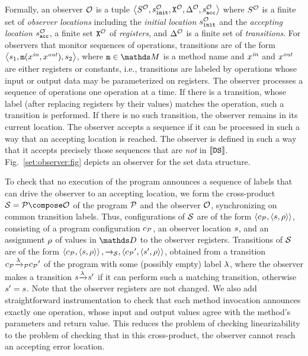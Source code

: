 Formally, an observer ${\mathcal O}$ is a tuple
$\left\langle S^{\mathcal O},s^{\mathcal O}_{\tt init},{\tt X}^{{\mathcal O}},\Delta^{\mathcal O},s^{\mathcal O}_{\tt acc}\right\rangle$ where $S^{\mathcal O}$ is a finite set 
of {\it observer locations} including the 
{\it initial location} $s^{\mathcal O}_{\tt init}$ and
the {\it accepting location} $s^{\mathcal O}_{\tt acc}$, 
a finite set ${\tt X}^{{\mathcal O}}$  
of {\it registers}, and $\Delta^{\mathcal O}$ is a finite
set of {\it transitions}.
%
%
For observers that monitor sequences of operations,
transitions are of the form 
$\left\langle s_1,{\tt m}(x^{\it in},x^{\it out}),s_2\right\rangle$,
where $\mname\in\malphabet$ is a method name and 
$x^{\it in}$ and $x^{\it out}$ are either registers or constants, i.e.,
transitions are labeled by 
operations whose input or output data may be parameterized on registers.
The observer processes a sequence of operations one operation at a time.
%
If there is a transition, whose label (after replacing registers by their
values) matches the operation, such a transition is performed. 
%
If there is no
such transition, the observer remains in its current location.
The observer accepts a sequence if it can  be processed in such a way that
an accepting location is reached.
%
The observer is defined in such a way that it accepts precisely those
sequences that are {\em not} in $\left\llbracket{{\tt DS}}\right\rrbracket$.
Fig.~\ref{set:observer:fig}
depicts an observer for the set data structure.

To check that no execution of the program announces a sequence of labels that
can drive the observer to an accepting location, we form
the cross-product $\system=\prog\compose\observer$ of the program ${\mathcal P}$
and the observer ${\mathcal O}$, synchronizing on common transition labels.
Thus, configurations of ${\mathcal S}$ are of the form
$\left\langle c_{{\mathcal P}},\left\langle s,\rho\right\rangle\right\rangle$, consisting of a program configuration
$c_{{\mathcal P}}$, an observer location $s$, and an assignment $\rho$ of values
in $\ddomain$ to the observer registers.
Transitions of ${\mathcal S}$ are of the form
$\left\langle c_{{\mathcal P}},\left\langle s,\rho\right\rangle\right\rangle,{\xrightarrow{}{}}_{\!\!{\mathcal S}},\left\langle{c_{{\mathcal P}}}',\left\langle s',\rho\right\rangle\right\rangle$,
obtained from a transition
$c_{{\mathcal P}} {\xrightarrow{\lambda}{}}_{\!\!{\mathcal P}} {c_{{\mathcal P}}}'$ of the program with some (possibly empty)
label $\lambda$, where the observer makes a transition
$s {\xrightarrow{\lambda}{}}_{\!\!} {s}'$ if it can perform such a matching
transition, otherwise $s' = s$.
Note that the observer registers are not changed.
We also add straightforward instrumentation to check that
each method invocation announces exactly one operation, whose input and output values
agree with the method's parameters and return value.
This reduces the
problem of checking linearizability to the problem of checking that
in this cross-product, the observer cannot reach an accepting error location.

